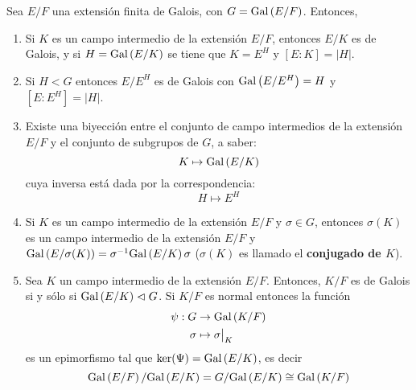 \documentclass[12pt]{report}
\theoremstyle{largebreak}
\newcommand\abs[1]{\ensuremath{\left|#1\right|}}
\begin{document}
    \renewcommand{\theenumi}{\roman{enumi}}

    \begin{theor}
        Sea $E/F$ una extensión finita de Galois, con $G=\textup{Gal}\left(E/F\right)$. Entonces,
        \begin{enumerate}
            \item Si $K$ es un campo intermedio de la extensión $E/F$, entonces $E/K$ es de Galois, y si $H=\textup{Gal}\left(E/K\right)$ se tiene que $K=E^H$ y $[E:K]=\abs{H}$.
            \item Si $H<G$ entonces $E/E^H$ es de Galois con $\textup{Gal}\left(E/E^H\right)=H$ y $[E:E^H]=\abs{H}$.
            \item Existe una biyección entre el conjunto de campo intermedios de la extensión $E/F$ y el conjunto de subgrupos de $G$, a saber:
            \begin{equation*}
                K\mapsto \textup{Gal}\left(E/K\right)
            \end{equation*}
            cuya inversa está dada por la correspondencia:
            \begin{equation*}
                H\mapsto E^H
            \end{equation*}
            \item Si $K$ es un campo intermedio de la extensión $E/F$ y $\sigma\in G$, entonces $\sigma(K)$ es un campo intermedio de la extensión $E/F$ y $\textup{Gal}\left(E/\sigma(K)\right)=\sigma^{-1}\textup{Gal}\left(E/K\right)\sigma$ ($\sigma(K)$ es llamado el \textbf{conjugado de $K$}).
            \item Sea $K$ un campo intermedio de la extensión $E/F$. Entonces, $K/F$ es de Galois si y sólo si $\textup{Gal}\left(E/K\right)\vartriangleleft G$. Si $K/F$ es normal entonces la función
            \begin{equation*}
                \begin{split}
                    \psi:G&\rightarrow \textup{Gal}\left(K/F\right)\\
                    \sigma&\mapsto \sigma\big|_K\\
                \end{split}
            \end{equation*}
            es un epimorfismo tal que $\ker(\Psi)=\textup{Gal}\left(E/K\right)$, es decir
            \begin{equation*}
                \textup{Gal}\left(E/F\right)/\textup{Gal}\left(E/K\right)=G/\textup{Gal}\left(E/K\right)\cong \textup{Gal}\left(K/F\right)
            \end{equation*}
        \end{enumerate}
    \end{theor}
        
\end{document}
